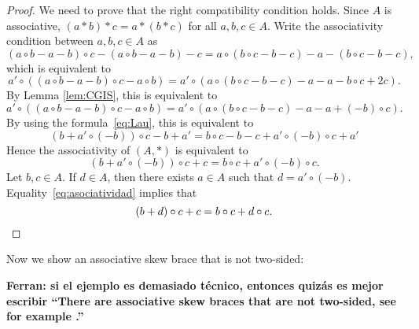 \begin{proof}
    We need to prove that the right compatibility condition holds. 
    Since $A$ is associative, $(a*b)*c=a*(b*c)$ for all $a,b,c\in A$. Write the associativity condition between $a,b,c\in A$ as
 	\[
 	(a\circ b-a-b)\circ c-(a\circ b-a-b)-c
 	=a\circ (b\circ c-b-c)-a-(b\circ c-b-c),
 	\]
 	which is equivalent to 
 	\[
 	a'\circ ( (a\circ b-a-b)\circ c-a\circ b)
 	=a'\circ ( a\circ (b\circ c-b-c)-a-a-b\circ c+2c).
 	\]
 	By Lemma \ref{lem:CGIS}, this is equivalent to
 	\[ a'\circ ( (a\circ b-a-b)\circ c-a\circ b)
 	=a'\circ ( a\circ (b\circ c-b-c)-a-a+(-b)\circ c).
 	\]
    By using the formula~\eqref{eq:Lau}, this is equivalent to  
 	\[
 	(b+a'\circ(-b))\circ c-b+a'=b\circ c-b-c+a'\circ (-b)\circ c+a'
 	\]
 	Hence the associativity of $(A,*)$ is equivalent to 
 	\begin{equation}
 	    \label{eq:asociatividad}
 		(b+a'\circ (-b))\circ c+c=b\circ c+a'\circ(-b)\circ c.
 	\end{equation}
 	Let $b,c\in A$. If $d\in A$, then there exists $a\in A$ such that $d=a'\circ (-b)$. Equality~\eqref{eq:asociatividad} 
    implies that 
 	\[
 	(b+d)\circ c+c=b\circ c+d\circ c.\qedhere
 	\]
\end{proof}


Now we show an associative skew brace that is not two-sided: 

\begin{example}
{\bf Ferran: si el ejemplo es demasiado técnico, entonces quizás es mejor escribir ``There are associative skew braces that are not two-sided, see for example \cite{}.''}
\end{example}

	
